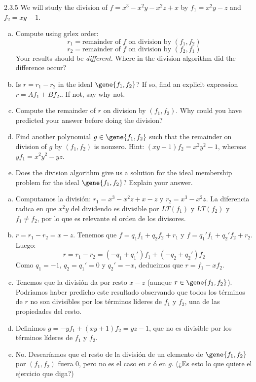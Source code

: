 \documentclass[twoside]{article}
\begin{document}
\begin{ejercicio}{2.3.5}
We will study the division of $f = x^3-x^2y-x^2z+x$ by $f_1 = x^2y-z$ and $f_2 = xy-1$.
\begin{enumerate}[a.]
\item Compute using grlex order:
\[ r_1 = \text{remainder of $f$ on division by $(f_1,f_2)$} \]
\[ r_2 = \text{remainder of $f$ on division by $(f_2,f_1)$} \]
Your results should be \emph{different}.
Where in the division algorithm did the difference occur?
\item Is $r = r_1-r_2$ in the ideal $\gene{f_1,f_2}$?
If so, find an explicit expression $r = Af_1 + Bf_2$..
If not, say why not.
\item Compute the remainder of $r$ on division by $(f_1,f_2)$.
Why could you have predicted your answer before doing the division?
\item Find another polynomial $g \in \gene{f_1,f_2}$ such that the remainder on division of $g$ by $(f_1,f_2)$ is nonzero.
Hint: $(xy+1)f_2 = x^2y^2-1$, whereas $yf_1 = x^2y^2-yz$.
\item Does the division algorithm give us a solution for the ideal membership problem for the ideal $\gene{f_1,f_2}$?
Explain your answer.
\end{enumerate}
\end{ejercicio}
\begin{solucion}
\begin{enumerate}[a.]
\item Computamos la división: $r_1 = x^3-x^2z+x-z$ y $r_2 = x^3-x^2z$. 
La diferencia radica en que $x^2y$ del dividendo es divisible por $LT(f_1)$ y $LT(f_2)$ y $f_1 \neq f_2$, por lo que es relevante el orden de los divisores.
\item $r=r_1-r_2 = x-z$. Tenemos que $f = q_1f_1+q_2f_2 + r_1$ y $f = q_1'f_1+q_2'f_2 + r_2$. Luego:
\[ r=r_1-r_2 = (-q_1+q_1')f_1+(-q_2+q_2')f_2 \]
Como $q_1 = -1$, $q_2 = q_1' = 0$ y $q_2' = -x$, deducimos que $r = f_1 - x f_2$.
\item Tenemos que la división da por resto $x-z$ (aunque $r \in \gene{f_1,f_2}$).
Podriamos haber predicho este resultado observando que todos los términos de $r$ no son divisibles por los términos líderes de $f_1$ y $f_2$, una de las propiedades del resto.
\item Definimos $g = -yf_1 + (xy+1)f_2 = yz-1$, que no es divisible por los términos líderes de $f_1$ y $f_2$.
\item No. Desearíamos que el resto de la división de un elemento de $\gene{f_1,f_2}$ por $(f_1,f_2)$ fuera $0$, pero no es el caso en $r$ ó en $g$.
(¿Es esto lo que quiere el ejercicio que diga?)
\end{enumerate}
\end{solucion}
\end{document}
